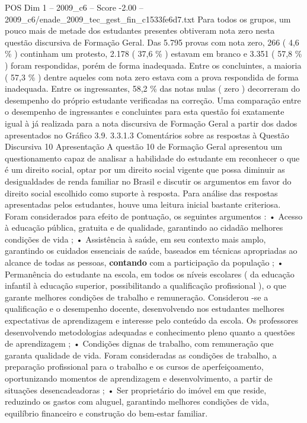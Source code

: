 \begin{textsample}{POS Dim 1 – 2009\_c6 – Score -2.00 – 2009\_c6/enade\_2009\_tec\_gest\_fin\_c1533fe6d7.txt}
Para todos os grupos, um pouco mais de metade dos estudantes presentes obtiveram nota zero nesta questão discursiva de Formação Geral.
Das 5.795 provas com nota zero, 266 ( 4,6 \% ) continham um protesto, 2.178 ( 37,6 \% ) estavam em branco e 3.351 ( 57,8 \% ) foram respondidas, porém de forma inadequada.
Entre os concluintes, a maioria ( 57,3 \% ) dentre aqueles com nota zero estava com a prova respondida de forma inadequada.
Entre os ingressantes, 58,2 \% das notas nulas ( zero ) decorreram do desempenho do próprio estudante verificadas na correção.
Uma comparação entre o desempenho de ingressantes e concluintes para esta questão foi exatamente igual à já realizada para a nota discursiva de Formação Geral a partir dos dados apresentados no Gráfico 3.9. 3.3.1.3 Comentários sobre as respostas à Questão Discursiva 10 Apresentação A questão 10 de Formação Geral apresentou um questionamento capaz de analisar a habilidade do estudante em reconhecer o que é um direito social, optar por um direito social vigente que possa diminuir as desigualdades de renda familiar no Brasil e discutir os argumentos em favor do direito social escolhido como suporte à resposta.
Para análise das respostas apresentadas pelos estudantes, houve uma leitura inicial bastante criteriosa.
Foram considerados para efeito de pontuação, os seguintes argumentos : • Acesso à educação pública, gratuita e de qualidade, garantindo ao cidadão melhores condições de vida ; • Assistência à saúde, em seu contexto mais amplo, garantindo os cuidados essenciais de saúde, baseados em técnicas apropriadas ao alcance de todas as pessoas, \textbf{contando} com a participação da população ; • Permanência do estudante na escola, em todos os níveis escolares ( da educação infantil à educação superior, possibilitando a qualificação profissional ), o que garante melhores condições de trabalho e remuneração.
Considerou -se a qualificação e o desempenho docente, desenvolvendo nos estudantes melhores expectativas de aprendizagem e interesse pelo conteúdo da escola.
Os professores desenvolvendo metodologias adequadas e conhecimento pleno quanto a questões de aprendizagem ; • Condições dignas de trabalho, com remuneração que garanta qualidade de vida.
Foram consideradas as condições de trabalho, a preparação profissional para o trabalho e os cursos de aperfeiçoamento, oportunizando momentos de aprendizagem e desenvolvimento, a partir de situações desencadeadoras ; • Ser proprietário do imóvel em que reside, reduzindo os gastos com aluguel, garantindo melhores condições de vida, equilíbrio financeiro e construção do bem-estar familiar.

\end{textsample}
